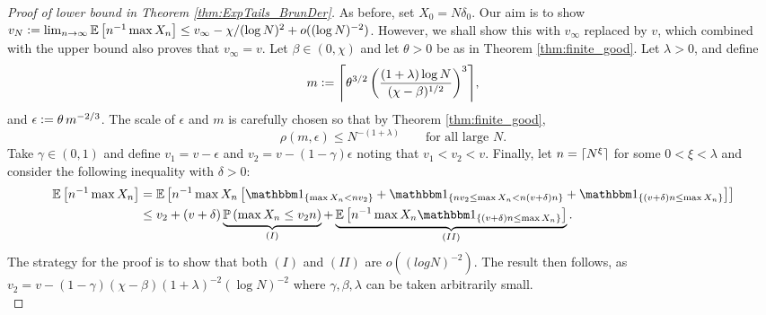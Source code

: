 \begin{proof}[Proof of lower bound in Theorem \ref{thm:ExpTails_BrunDer}]
As before, set $X_0 = N \delta_0$. Our aim is to show $v_N \vcentcolon= \lim_{n \to \infty} \mathbb{E}\left[ n^{-1} \max X_n \right] \leq v_\infty - \chi / (\log N)^2 + o((\log N)^{-2})$. However, we shall show this with $v_\infty$ replaced by $v$, which combined with the upper bound also proves that $v_\infty = v$. Let $\beta \in (0, \chi)$ and let $\theta > 0$ be as in Theorem \ref{thm:finite_good}. Let $\lambda > 0$, and define 
\begin{equation}
m \defeq \ceil*{\theta^{3/2}\left( \frac{(1 + \lambda) \log N}{(\chi - \beta)^{1/2}}\right)^3},
\end{equation}
and $\epsilon \vcentcolon= \theta\, m^{-2/3}$. The scale of $\epsilon$ and $m$ is carefully chosen so that by Theorem \ref{thm:finite_good}, 
\begin{equation}
\rho(m, \epsilon) \leq N^{-(1 + \lambda)} \qquad\text{for all large } N. 
\end{equation}
Take $\gamma \in (0, 1)$ and define $v_1 = v - \epsilon$ and $v_2 = v - (1 - \gamma) \epsilon$ noting that $v_1 < v_2 < v$. Finally, let $n = \lceil N^\xi\rceil$ for some $0 < \xi < \lambda$ and consider the following inequality with $\delta > 0$:
\begin{align}
\Ex{n^{-1} \max X_n} &= \Ex{n^{-1} \max X_n \left[ \Ind_{\{ \max X_n < n v_2\}} + \Ind_{\{ n v_2 \leq \max X_n < n (v + \delta)n \}} + \Ind_{\{ (v + \delta)n \leq \max X_n \}} \right]}\nonumber \\
					&\leq v_2 + (v+\delta)\underbrace{\Pr{\max X_n \leq v_2 n}}_{(I)} + \underbrace{\Ex{n^{-1} \max X_n \Ind_{\{ (v + \delta)n \leq \max X_n \}}}}_{(II)}. \label{ExpTailThmDecomposition}
\end{align}
The strategy for the proof is to show that both $(I)$ and $(II)$ are $o((log N)^{-2})$. The result then follows, as $v_2 = v - (1 - \gamma)(\chi - \beta)(1+\lambda)^{-2}(\log N)^{-2}$ where $\gamma, \beta, \lambda$ can be taken arbitrarily small. \\ 


\end{proof}
